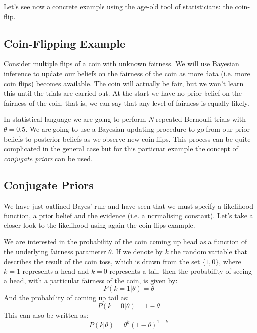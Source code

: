 Let's see now a concrete example using the age-old tool of statisticians: the coin-flip.

\subsection{Coin-Flipping Example}
Consider multiple flips of a coin with unknown fairness. We will use Bayesian inference to update our beliefs on the fairness of the coin as more data (i.e. more coin flips) becomes available. The coin will actually be fair, but we won't learn this until the trials are carried out. At the start we have no prior belief on the fairness of the coin, that is, we can say that any level of fairness is equally likely.

In statistical language we are going to perform $N$ repeated Bernoulli trials with $\theta=0.5$. %
We are going to use a Bayesian updating procedure to go from our prior beliefs to posterior beliefs as we observe new coin flips. 
This process can be quite complicated in the general case but for this particuar example the concept of \emph{conjugate priors} can be used.

\subsection{Conjugate Priors}
We have just outlined Bayes' rule and have seen that we must specify a likelihood function, a prior belief and the evidence (i.e. a normalising constant). Let's take a closer look to the likelihood using again the coin-flips example.

We are interested in the probability of the coin coming up head as a function of the underlying fairness parameter $\theta$.
If we denote by $k$ the random variable that describes the result of the coin toss, which is drawn from the set $\{1, 0\}$, where $k=1$ represents a head and $k=0$ represents a tail, then the probability of seeing a head, with a particular fairness of the coin, is given by:
\begin{equation}
  P(k=1|\theta) = \theta 
\end{equation}
And the probability of coming up tail as:
\begin{equation}
  P(k=0|\theta) = 1-\theta 
\end{equation}
This can also be written as:
\begin{equation}
  P(k|\theta) = \theta^k(1-\theta)^{1-k} 
\end{equation}

